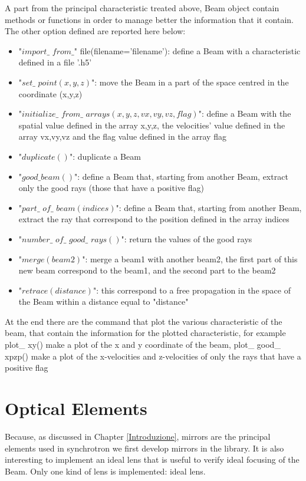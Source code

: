 A part from the principal characteristic treated above, Beam object contain methods or functions in order to manage better the information that it contain. The other option defined are reported here below:
\begin{itemize}
\item "$import\_$ $from\_$" file(filename='filename'): define a Beam with a characteristic defined in a file '.h5'
\item "$set\_$ $point(x,y,z)$": move the Beam in a part of the space centred in the coordinate (x,y,z)
\item "$initialize\_$ $from\_$ $arrays(x, y, z, vx, vy, vz, flag)$": define a Beam with the spatial value defined in the array x,y,z, the velocities' value defined in the array vx,vy,vz and the flag value defined in the array flag
\item "$duplicate()$": duplicate a Beam
\item "$good\_ beam()$": define a Beam that, starting from another Beam, extract only the good rays (those that have a positive flag)
\item "$part\_$ $of\_$ $beam(indices)$": define a Beam that, starting from another Beam, extract the ray that correspond to the position defined in the array indices
\item "$number\_$ $of\_$ $good\_$ $rays()$": return the values of the good rays
\item "$merge(beam2)$": merge a beam1 with another beam2, the first part of this new beam correspond to the beam1, and the second part to the beam2
\item "$retrace(distance)$": this correspond to a free propagation in the space of the Beam within a distance equal to "distance" 
\end{itemize}
At the end there are the command that plot the various characteristic of the beam, that contain the information for the plotted characteristic, for example plot\_ xy() make a plot of the x and y coordinate of the beam, plot\_ good\_ xpzp() make a plot of the x-velocities and z-velocities of only the rays that have a positive flag


\section{Optical Elements}
Because, as discussed in Chapter \ref{Introduzione}, mirrors are the principal elements used in synchrotron we first develop mirrors in the library. It is also interesting to implement an ideal lens that is useful to verify ideal focusing of the Beam. Only one kind of lens is implemented: ideal lens.
